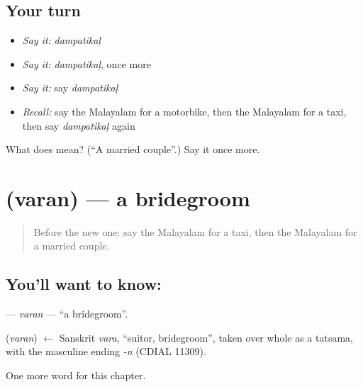 \subsection*{Your turn}
\begin{itemize}
\raggedright
  \item \emph{Say it:} \emph{dampatikaḷ}
  \item \emph{Say it:} \emph{dampatikaḷ}, once more
  \item \emph{Say it:} say \emph{dampatikaḷ}
  \item \emph{Recall:} say the Malayalam for a motorbike, then the Malayalam for a taxi, then say \emph{dampatikaḷ} again
\end{itemize}

\begin{tcolorbox}[breakable,colback=teal!4,colframe=teal!35!black,title={Before you move on}]
What does  mean? (\textquotedblleft{}A married couple\textquotedblright{}.) Say it once more.
\end{tcolorbox}
\section[\texorpdfstring{\ml{വരൻ} (varan)}{വരൻ (varan)}]{ (varan) — a bridegroom}

\label{lesson:ML-C211-varan}



\begin{quote}
Before the new one: say the Malayalam for a taxi, then the Malayalam for a married couple.
\end{quote}

\subsection*{You'll want to know: }
\textbf{} — \emph{varan} — \textquotedblleft{}a bridegroom\textquotedblright{}.

\begin{cousinweb}
\textbf{} (\emph{varan}) $\leftarrow$ Sanskrit \emph{vara}, \textquotedblleft{}suitor, bridegroom\textquotedblright{}, taken over whole as a tatsama, with the masculine ending \emph{-n} (CDIAL 11309).
\end{cousinweb}

\begin{grammarlens}[title={What you've built}]
One more word for this chapter.
\end{grammarlens}

